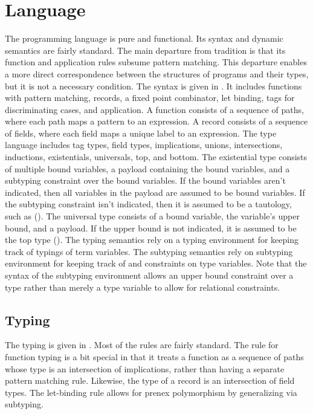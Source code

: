 \documentclass[acmsmall]{acmart}
\theoremstyle{definition}
\begin{document}
\section{Language}
The programming language is pure and functional. Its syntax and dynamic semantics 
are fairly standard. The main departure from tradition is that its function
and application rules subsume pattern matching. This departure enables a more direct  
correspondence between the structures of programs and their types, but it is 
not a necessary condition.
The syntax is given in .
It includes functions with pattern matching, records, a fixed point combinator, let binding, 
tags for discriminating cases, and application.
A function consists of a sequence of paths, where each path maps a pattern to an expression.
A record consists of a sequence of fields, where each field maps a unique label to an expression. 
The type language includes tag types, field types, implications, unions, intersections, 
inductions, existentials, universals, top, and bottom. 
The existential type consists of multiple bound variables, a payload containing the bound variables, 
and a subtyping constraint over the bound variables. 
If the bound variables aren't indicated, then all variables in the payload are
assumed to be bound variables. If the subtyping constraint isn't indicated, then it is assumed to 
be a tautology, such as ().
The universal type consists of a bound variable, the variable's upper bound, and a payload. If the upper
bound is not indicated, it is assumed to be the top type ().
The typing semantics rely on a typing environment for keeping track of typings of term variables.
The subtyping semantics rely on subtyping environment for keeping track of and constraints on type variables. 
Note that the syntax of the subtyping environment allows an upper bound constraint over a type
rather than merely a type variable to allow for relational constraints. 




\subsection{Typing}
The typing is given in .
Most of the rules are fairly standard. 
The rule for function typing is a bit special in that
it treats a function as a sequence of paths whose type is an intersection of implications,
rather than having a separate pattern matching rule. 
Likewise, the type of a record is an intersection of field types.
The let-binding rule allows for prenex polymorphism by generalizing via subtyping. 
\end{document}
